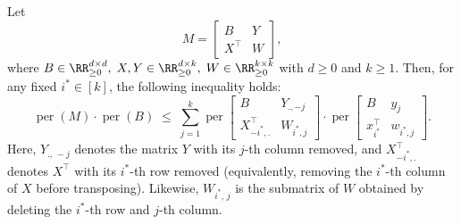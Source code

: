 \documentclass[11pt]{article}
\theoremstyle{definition}
\DeclareMathOperator{\per}{per}
\begin{document}
\begin{lemma}
	\label{lem:row-uncrossing-perm}
	Let
	\begin{equation*}
	    M = \begin{bmatrix}
		B & Y \\
		X^{\top} & W
	\end{bmatrix},
	\end{equation*}
	where 
	\(
	B \in \RR^{d \times d}_{\ge 0},\;
	X, Y \in \RR^{d \times k}_{\ge 0},\;
	W \in \RR^{k \times k}_{\ge 0}
	\)
	with \(d \ge 0\) and \(k \ge 1\).
	Then, for any fixed \( i^* \in [k] \), the following inequality holds:
	\begin{equation}
		\label{eqn:row-uncrossing-perm}
		\per(M) \cdot \per(B)
		\;\le\;
		\sum_{j=1}^k 
		\per\begin{bmatrix}
			B & Y_{., -j} \\
			X_{-i^*, .}^{\top} & W_{i^*, j}
		\end{bmatrix}
		\cdot
		\per\begin{bmatrix}
			B & y_j \\
			x_{i^*}^{\top} & w_{i^*, j}
		\end{bmatrix}.
	\end{equation}
	Here, \( Y_{.,\, -j} \) denotes the matrix \( Y \) with its \( j \)-th column removed, and \( X_{-i^*, .}^{\top} \) denotes \( X^{\top} \) with its \( i^* \)-th row removed (equivalently, removing the \( i^* \)-th column of \( X \) before transposing). Likewise, \( W_{i^*,\,j} \) is the submatrix of \( W \) obtained by deleting the \( i^* \)-th row and \( j \)-th column.
\end{lemma}
\end{document}
